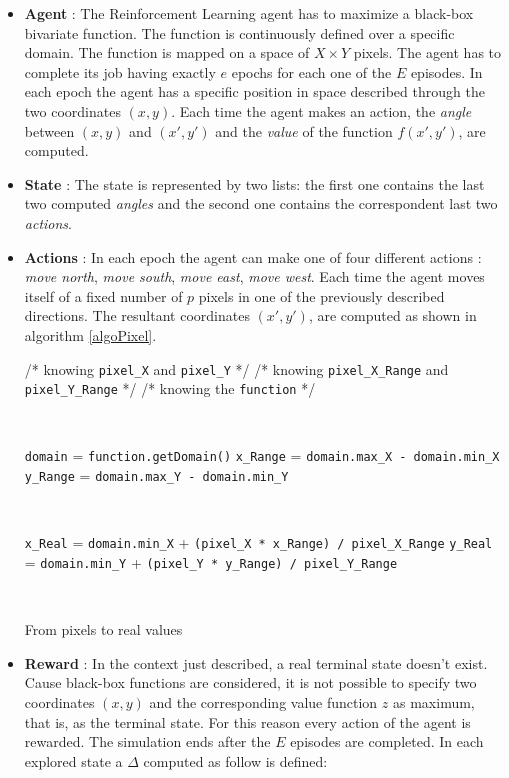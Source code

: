 \begin{itemize}
	
	\item \textbf{Agent} : The Reinforcement Learning agent has to maximize a black-box bivariate function. The function is continuously defined over a specific domain. The function is mapped on a space of $X \times Y$ pixels. The agent has to complete its job having exactly $e$ epochs for each one of the $E$ episodes. In each epoch the agent has a specific position in space described through the two coordinates $(x, y)$. Each time the agent makes an action, the \textit{angle} between $(x, y)$ and $(x', y')$ and the \textit{value} of the function $f(x', y')$, are computed.
	
	\item \textbf{State} : The state is represented by two lists: the first one contains the last two computed \textit{angles} and the second one contains the correspondent last two \textit{actions}.
	
	\item \textbf{Actions} : In each epoch the agent can make one of four different actions : \textit{move north}, \textit{move  south}, \textit{move east}, \textit{move west}. Each time the agent moves itself of a fixed number of $p$ pixels in one of the previously described directions. The resultant coordinates $(x', y')$, are computed as shown in algorithm \ref{algoPixel}.
	
	\begin{algorithm} [h!]
		/* knowing {\tt pixel\_X} and {\tt pixel\_Y} */\;
		/* knowing {\tt pixel\_X\_Range} and {\tt pixel\_Y\_Range} */ \;
		/* knowing the {\tt function} */\;
		
		\
		
		{\tt domain} = {\tt function.getDomain()} \;
		{\tt x\_Range} = {\tt domain.max\_X - domain.min\_X} \;
		{\tt y\_Range} = {\tt domain.max\_Y - domain.min\_Y} \;
		
		\
		
		{\tt x\_Real} = {\tt domain.min\_X} + {\tt(pixel\_X * x\_Range) / pixel\_X\_Range} \;
		{\tt y\_Real} = {\tt domain.min\_Y} + {\tt (pixel\_Y * y\_Range) / pixel\_Y\_Range} \;
		
		\
		
		\caption{From pixels to real values} 
		\label{algoPixel}
	\end{algorithm}
	
	\item \textbf{Reward} : In the context just described, a real terminal state doesn't exist. Cause black-box functions are considered, it is not possible to specify two coordinates $(x, y)$ and the corresponding value function $z$ as maximum, that is, as the terminal state. For this reason every action of the agent is rewarded. The simulation ends after the $E$ episodes are completed.
	In each explored state a $\Delta$ computed as follow is defined: 
	

\end{itemize}
